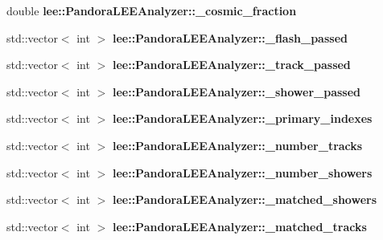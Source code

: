 \begin{DoxyCompactItemize}
\item 
\hypertarget{group__lee_ga9d3deef73e6dd40b958cb4709ddea35c}{double {\bfseries lee\-::\-Pandora\-L\-E\-E\-Analyzer\-::\-\_\-cosmic\-\_\-fraction}}\label{group__lee_ga9d3deef73e6dd40b958cb4709ddea35c}

\item 
\hypertarget{group__lee_ga39d4c9760193a606cfdeb7af7195486c}{std\-::vector$<$ int $>$ {\bfseries lee\-::\-Pandora\-L\-E\-E\-Analyzer\-::\-\_\-flash\-\_\-passed}}\label{group__lee_ga39d4c9760193a606cfdeb7af7195486c}

\item 
\hypertarget{group__lee_ga222f64bba75838505ac948638260ed6b}{std\-::vector$<$ int $>$ {\bfseries lee\-::\-Pandora\-L\-E\-E\-Analyzer\-::\-\_\-track\-\_\-passed}}\label{group__lee_ga222f64bba75838505ac948638260ed6b}

\item 
\hypertarget{group__lee_ga677892512d8f61dd3783e04b2522925f}{std\-::vector$<$ int $>$ {\bfseries lee\-::\-Pandora\-L\-E\-E\-Analyzer\-::\-\_\-shower\-\_\-passed}}\label{group__lee_ga677892512d8f61dd3783e04b2522925f}

\item 
\hypertarget{group__lee_ga3020305a22a83591e103b8124140cea6}{std\-::vector$<$ int $>$ {\bfseries lee\-::\-Pandora\-L\-E\-E\-Analyzer\-::\-\_\-primary\-\_\-indexes}}\label{group__lee_ga3020305a22a83591e103b8124140cea6}

\item 
\hypertarget{group__lee_ga413d54bca989124f2aaec5837c930a22}{std\-::vector$<$ int $>$ {\bfseries lee\-::\-Pandora\-L\-E\-E\-Analyzer\-::\-\_\-number\-\_\-tracks}}\label{group__lee_ga413d54bca989124f2aaec5837c930a22}

\item 
\hypertarget{group__lee_ga636e7f5eece11bbd0d0188ea073c1ee5}{std\-::vector$<$ int $>$ {\bfseries lee\-::\-Pandora\-L\-E\-E\-Analyzer\-::\-\_\-number\-\_\-showers}}\label{group__lee_ga636e7f5eece11bbd0d0188ea073c1ee5}

\item 
\hypertarget{group__lee_ga51ecdfb466b876fde01072e95408bedb}{std\-::vector$<$ int $>$ {\bfseries lee\-::\-Pandora\-L\-E\-E\-Analyzer\-::\-\_\-matched\-\_\-showers}}\label{group__lee_ga51ecdfb466b876fde01072e95408bedb}

\item 
\hypertarget{group__lee_ga31e3e0db2ea3526c148ab1d98cd3b35c}{std\-::vector$<$ int $>$ {\bfseries lee\-::\-Pandora\-L\-E\-E\-Analyzer\-::\-\_\-matched\-\_\-tracks}}\label{group__lee_ga31e3e0db2ea3526c148ab1d98cd3b35c}


\end{DoxyCompactItemize}
